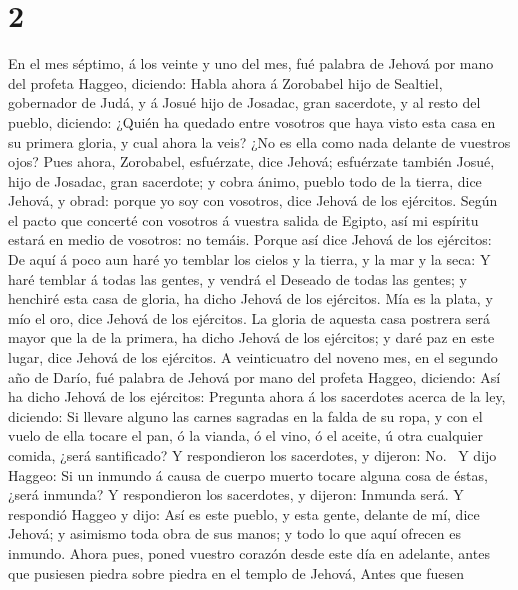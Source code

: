\hypertarget{section-1}{%
\section{2}\label{section-1}}

 En el mes séptimo, á los veinte y uno del mes, fué palabra
de Jehová por mano del profeta Haggeo, diciendo:  Habla
ahora á Zorobabel hijo de Sealtiel, gobernador de Judá, y á Josué hijo
de Josadac, gran sacerdote, y al resto del pueblo, diciendo:
 ¿Quién ha quedado entre vosotros que haya visto esta casa
en su primera gloria, y cual ahora la veis? ¿No es ella como nada
delante de vuestros ojos?  Pues ahora, Zorobabel,
esfuérzate, dice Jehová; esfuérzate también Josué, hijo de Josadac, gran
sacerdote; y cobra ánimo, pueblo todo de la tierra, dice Jehová, y
obrad: porque yo soy con vosotros, dice Jehová de los ejércitos.
 Según el pacto que concerté con vosotros á vuestra salida
de Egipto, así mi espíritu estará en medio de vosotros: no temáis.
 Porque así dice Jehová de los ejércitos: De aquí á poco aun
haré yo temblar los cielos y la tierra, y la mar y la seca: 
Y haré temblar á todas las gentes, y vendrá el Deseado de todas las
gentes; y henchiré esta casa de gloria, ha dicho Jehová de los
ejércitos.  Mía es la plata, y mío el oro, dice Jehová de
los ejércitos.  La gloria de aquesta casa postrera será
mayor que la de la primera, ha dicho Jehová de los ejércitos; y daré paz
en este lugar, dice Jehová de los ejércitos.  A
veinticuatro del noveno mes, en el segundo año de Darío, fué palabra de
Jehová por mano del profeta Haggeo, diciendo:  Así ha dicho
Jehová de los ejércitos: Pregunta ahora á los sacerdotes acerca de la
ley, diciendo:  Si llevare alguno las carnes sagradas en la
falda de su ropa, y con el vuelo de ella tocare el pan, ó la vianda, ó
el vino, ó el aceite, ú otra cualquier comida, ¿será santificado? Y
respondieron los sacerdotes, y dijeron: No.~ Y dijo Haggeo:
Si un inmundo á causa de cuerpo muerto tocare alguna cosa de éstas,
¿será inmunda? Y respondieron los sacerdotes, y dijeron: Inmunda será.
 Y respondió Haggeo y dijo: Así es este pueblo, y esta
gente, delante de mí, dice Jehová; y asimismo toda obra de sus manos; y
todo lo que aquí ofrecen es inmundo.  Ahora pues, poned
vuestro corazón desde este día en adelante, antes que pusiesen piedra
sobre piedra en el templo de Jehová,  Antes que fuesen
